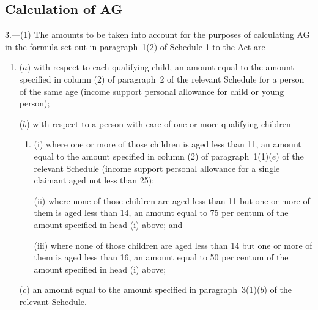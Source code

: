 \documentclass[12pt,a4paper]{article}
\begin{document}
\subsection[3. Calculation of AG]{Calculation of AG}

3.—(1) The amounts to be taken into account for the purposes of calculating AG in the formula set out in paragraph~1(2) of Schedule 1 to the Act are—
\begin{enumerate}\item[]
($a$) with respect to each qualifying child, an amount equal to the amount specified in column (2) of paragraph~2 of the relevant Schedule for a person of the same age (income support personal allowance for child or young person);


($b$) with respect to a person with care of one or more qualifying children—
\begin{enumerate}\item[]
(i) where one or more of those children is aged less than 11, an amount equal to the amount specified in column (2) of paragraph~1(1)($e$) of the relevant Schedule (income support personal allowance for a single claimant aged not less than 25);

(ii) where none of those children are aged less than 11 but one or more of them is aged less than 14, an amount equal to 75 per centum of the amount specified in head (i) above; and

(iii) where none of those children are aged less than 14 but one or more of them is aged less than 16, an amount equal to 50 per centum of the amount specified in head (i) above;
\end{enumerate} %


%

($c$) an amount equal to the amount specified in paragraph~3(1)($b$) of the relevant Schedule.

\end{enumerate}
\end{document}
